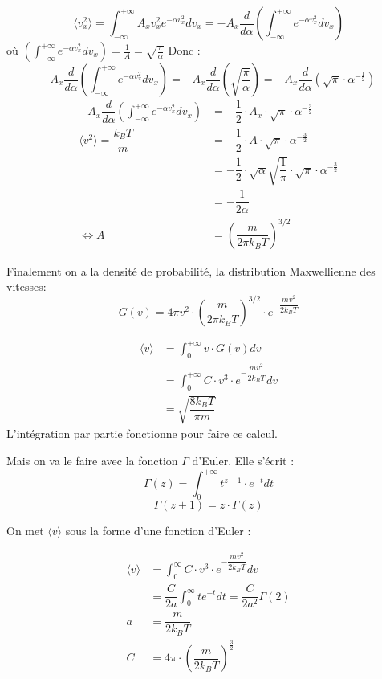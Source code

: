 \documentclass[12pt,a4paper]{report}
\begin{document}
\[
	\langle v_x^2 \rangle = \int_{-\infty}^{+\infty} A_x v_x^2 e^{-\alpha v_x^2} dv_x = -A_x \dfrac{d}{d\alpha}\left( \int_{-\infty}^{+\infty} e^{-\alpha v_x^2} dv_x \right)
\]
où \(\left( \int_{-\infty}^{+\infty} e^{-\alpha v_x^2} dv_x \right) = \frac{1}{A} = \sqrt{\frac{\pi}{\alpha}}\)
Donc :
\[
	-A_x \dfrac{d}{d\alpha}\left( \int_{-\infty}^{+\infty} e^{-\alpha v_x^2} dv_x \right) = -A_x \dfrac{d}{d\alpha} \left(\sqrt{\frac{\pi}{\alpha}}\right) = -A_x \dfrac{d}{d\alpha} \left(\sqrt{\pi} \cdot \alpha^{-\frac{1}{2}}\right)
\]
\begin{align*}
	-A_x \dfrac{d}{d\alpha}\left( \int_{-\infty}^{+\infty} e^{-\alpha v_x^2} dv_x \right) &= -\dfrac{1}{2} \cdot A_x \cdot \sqrt{\pi} \cdot \alpha^{-\frac{3}{2}}\\
	\langle v^2 \rangle = \dfrac{k_B T}{m} &= -\dfrac{1}{2} \cdot A \cdot \sqrt{\pi} \cdot \alpha^{-\frac{3}{2}}\\
	&= -\dfrac{1}{2} \cdot \sqrt{\alpha} \sqrt{\dfrac{1}{\pi}} \cdot \sqrt{\pi} \cdot \alpha^{-\frac{3}{2}}\\
	&= -\dfrac{1}{2\alpha}\\
	\Leftrightarrow A &= \left( \dfrac{m}{2\pi k_B T} \right)^{3/2}
\end{align*}

Finalement on a la densité de probabilité, la distribution Maxwellienne des vitesses:
\[
	G(v) = 4\pi v^2 \cdot \left( \dfrac{m}{2\pi k_B T}\right)^{3/2} \cdot e^{-\dfrac{mv^2}{2k_B T}}
\]

\begin{align*}
	\langle v \rangle &= \int_0^{+\infty} v \cdot G(v) dv\\
	&=  \int_0^{+\infty} C \cdot	v^3 \cdot e^{-\dfrac{mv^2}{2k_B T}} dv\\
	&= \sqrt{\dfrac{8k_B T}{\pi m}}
\end{align*}
L'intégration par partie fonctionne pour faire ce calcul.

Mais on va le faire avec la fonction \(\Gamma\) d'Euler. Elle s'écrit :
\[
	\Gamma(z) = \int_0^{+\infty} t^{z-1} \cdot e^{-t} dt
\]
\[
	\Gamma(z + 1) = z \cdot \Gamma(z) 
\]

On met \(\langle v \rangle\) sous la forme d'une fonction d'Euler :

\begin{align*}
	\langle v \rangle &= \int_0^{\infty} C \cdot v^3 \cdot e^{-\dfrac{mv^2}{2k_B T}} dv\\
	&= \dfrac{C}{2a} \int_0^{\infty} te^{-t} dt = \dfrac{C}{2a^2} \Gamma(2)\\
	a &= \dfrac{m}{2k_B T}\\
	C &= 4\pi \cdot \left( \dfrac{m}{2k_B T}\right)^\frac{3}{2}
\end{align*}
\end{document}
